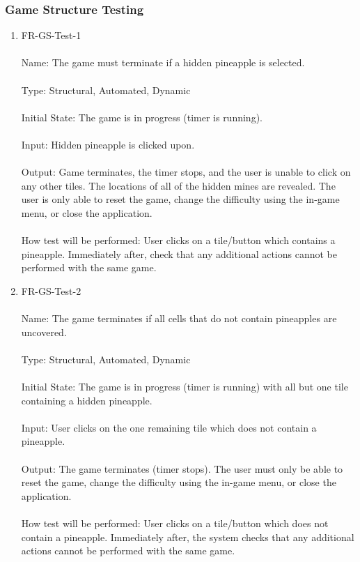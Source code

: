 \documentclass[12pt, titlepage]{article}
\begin{document}
\newpage
\subsubsection{Game Structure Testing}

\begin{enumerate}
\item{FR-GS-Test-1\\\\}
Name: The game must terminate if a hidden pineapple is selected.\\\\
Type: Structural, Automated, Dynamic\\\\
Initial State: The game is in progress (timer is running).\\\\
Input: Hidden pineapple is clicked upon.\\\\
Output: Game terminates, the timer stops, and the user is unable to click on any other tiles. The locations of all of the hidden mines are revealed. The user is only able to reset the game, change the difficulty using the in-game menu, or close the application.\\\\
How test will be performed: User clicks on a tile/button which contains a pineapple. Immediately after, check that any additional actions cannot be performed with the same game.

\item{FR-GS-Test-2\\\\}
Name: The game terminates if all cells that do not contain pineapples are uncovered.\\\\
Type: Structural, Automated, Dynamic\\\\
Initial State: The game is in progress (timer is running) with all but one tile containing a hidden pineapple.\\\\
Input: User clicks on the one remaining tile which does not contain a pineapple.\\\\
Output: The game terminates (timer stops). The user must only be able to reset the game, change the difficulty using the in-game menu, or close the application.\\\\
How test will be performed: User clicks on a tile/button which does not contain a pineapple. Immediately after, the system checks that any additional actions cannot be performed with the same game.\\


\end{enumerate}
\end{document}
